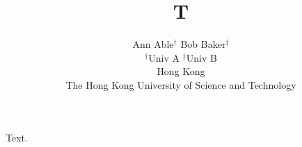 \documentclass{article}
\title{T}
\author{Ann Able$^{\dagger}$ \quad Bob Baker$^{\ddagger}$ \\ $^\dagger$Univ A \quad $^\ddagger$Univ B \\ Hong Kong \\ The Hong Kong University of Science and Technology}
\begin{document}
\maketitle
Text.
\end{document}
